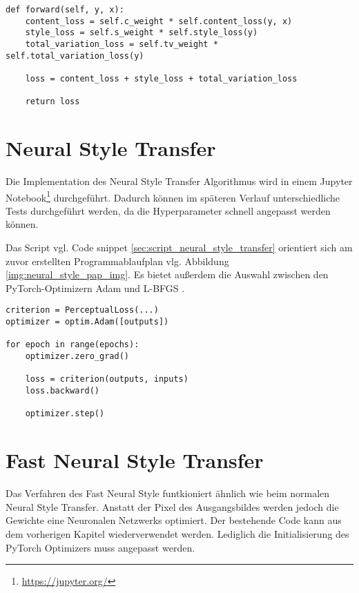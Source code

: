 \begin{listing}[H]
\begin{verbatim}
def forward(self, y, x):
    content_loss = self.c_weight * self.content_loss(y, x)
    style_loss = self.s_weight * self.style_loss(y)
    total_variation_loss = self.tv_weight * self.total_variation_loss(y)

    loss = content_loss + style_loss + total_variation_loss

    return loss
\end{verbatim}
\end{listing}

\section{Neural Style Transfer}

Die Implementation des Neural Style Transfer Algorithmus wird in einem Jupyter Notebook\footnote{\url{https://jupyter.org/}} durchgeführt. 
Dadurch können im späteren Verlauf unterschiedliche Tests durchgeführt werden, da die Hyperparameter schnell angepasst werden können.

Das Script vgl. Code snippet \ref{sec:script_neural_style_transfer} orientiert sich am zuvor erstellten Programmablaufplan vlg. Abbildung \ref{img:neural_style_pap_img}. Es bietet außerdem die Auswahl zwischen den PyTorch-Optimizern Adam und L-BFGS \cite{Liu1989}.

\begin{listing}[H]
\begin{verbatim}
criterion = PerceptualLoss(...)
optimizer = optim.Adam([outputs])

for epoch in range(epochs):
    optimizer.zero_grad()

    loss = criterion(outputs, inputs)
    loss.backward()

    optimizer.step()    
\end{verbatim}
\end{listing}

\section{Fast Neural Style Transfer}

Das Verfahren des Fast Neural Style funtkioniert ähnlich wie beim normalen Neural Style Transfer.
Anstatt der Pixel des Ausgangsbildes werden jedoch die Gewichte eine Neuronalen Netzwerks optimiert.
Der bestehende Code kann aus  dem vorherigen Kapitel wiederverwendet werden. 
Lediglich die Initialisierung des PyTorch Optimizers muss angepasst werden.

